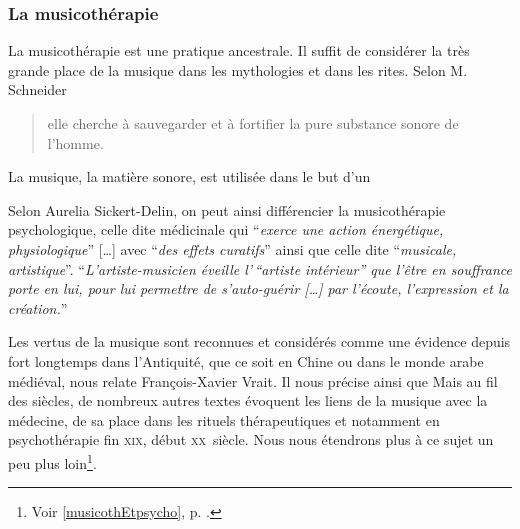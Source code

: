  



\subsubsection{La musicothérapie}
La musicothérapie est une pratique ancestrale. Il suffit de considérer la très 
grande  place de la musique dans les mythologies et dans les rites.  Selon M. 
Schneider \blockquote{elle cherche à sauvegarder et à fortifier la pure 
substance sonore de l'homme\autocite[Voir tome I, pp. 202--203]%
	[M. Schneider, <<Le rôle  de la musique dans la mythologie et les rites 
des civilisations non européennes>>]{schaeffner.ea:histoire}.}

La musique, la matière sonore, est utilisée dans le but d'un 

 Selon Aurelia Sickert-Delin, on peut ainsi différencier la musicothérapie 
psychologique, celle dite médicinale qui \enquote{\emph{exerce une action 
énergétique, physiologique}} [\dots] avec \enquote{\emph{des effets curatifs}}  
ainsi que celle dite \enquote{\emph{musicale, artistique}}.
 \enquote{\emph{L'artiste-musicien éveille l'\,``artiste intérieur'' que l'être 
en souffrance porte en lui, pour lui permettre de s'auto-guérir [\dots] par 
l'écoute, l'expression et la création.}}\autocite[ch. 1,  p. 14, du texte 
inédit communiqué par A. Sickert-Delin, musicothérapeute à Alersheim, à J. 
Viret]{viret:b}
 	 
 	 
Les vertus de la musique sont reconnues et considérés comme une évidence depuis 
fort longtemps dans l'Antiquité, que ce soit en Chine ou dans le monde arabe 
médiéval, nous relate François-Xavier Vrait.  
 Il nous précise ainsi que \autocite[ch. III, p. 
96]{vrait_musicotherapie_2018} Mais au fil des siècles, de nombreux autres 
textes évoquent les liens de la musique avec la médecine, de sa place dans les 
rituels thérapeutiques et notamment en psychothérapie fin \textsc{xix}\ieme, 
début \textsc{xx}\ieme\ siècle. Nous nous étendrons plus à ce sujet un peu plus 
loin\footnote{Voir \ref{musicothEtpsycho}, p. \pageref{musicothEtpsycho}.}.
 

